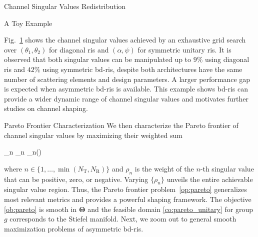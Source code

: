 \documentclass[journal]{IEEEtran}
\begin{document}
\begin{section}{Channel Singular Values Redistribution}
\begin{subsection}{A Toy Example}
\begin{figure}
			\label{sm:pc_singular_toy}
		\end{figure}
		Fig.~\ref{sm:pc_singular_toy} shows the channel singular values achieved by an exhaustive grid search over $(\theta_1, \theta_2)$ for diagonal \gls{ris} and $(\alpha, \psi)$ for symmetric unitary \gls{ris}.
		It is observed that both singular values can be manipulated up to $9\%$ using diagonal \gls{ris} and $42\%$ using symmetric \gls{bd}-\gls{ris}, despite both architectures have the same number of scattering elements and design parameters.
		A larger performance gap is expected when asymmetric \gls{bd}-\gls{ris} is available.
		This example shows \gls{bd}-\gls{ris} can provide a wider dynamic range of channel singular values and motivates further studies on channel shaping.
	\end{subsection}

	\begin{subsection}{Pareto Frontier Characterization}
		We then characterize the Pareto frontier of channel singular values by maximizing their weighted sum
		\begin{maxi!}
			{\scriptstyle{\mathbf{\Theta}}}{\sum_n \rho_n \sigma_n()}{\label{op:pareto}}{\label{ob:pareto}}
		\end{maxi!}
		where $n \in \{1,\ldots,\min(N_\mathrm{T}, N_\mathrm{R})\}$ and $\rho_n$ is the weight of the $n$-th singular value that can be positive, zero, or negative.
		Varying $\{\rho_n\}$ unveils the entire achievable singular value region.
		Thus, the Pareto frontier problem~\eqref{op:pareto} generalizes most relevant metrics and provides a powerful shaping framework.
		The objective \eqref{ob:pareto} is smooth in $\mathbf{\Theta}$ and the feasible domain \eqref{co:pareto_unitary} for group $g$ corresponds to the Stiefel manifold.
		Next, we zoom out to general smooth maximization problems of asymmetric \gls{bd}-\gls{ris}.


\end{subsection}
\end{section}
\end{document}
